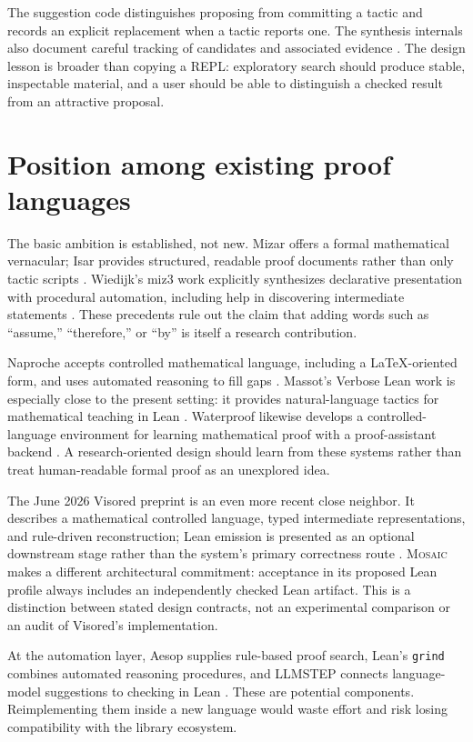 \documentclass[11pt,a4paper]{article}
\newcommand{\code}[1]{\texttt{\small #1}}
\newcommand{\Mosaic}{\textsc{Mosaic}}
\theoremstyle{definition}
\theoremstyle{remark}
\begin{document}
The suggestion code distinguishes proposing from committing a tactic and records an explicit replacement when a tactic reports one. The synthesis internals also document careful tracking of candidates and associated evidence \cite{leant-main,leant-internals}. The design lesson is broader than copying a REPL: exploratory search should produce stable, inspectable material, and a user should be able to distinguish a checked result from an attractive proposal.

\section{Position among existing proof languages}
\label{sec:prior}
The basic ambition is established, not new. Mizar offers a formal mathematical vernacular; Isar provides structured, readable proof documents rather than only tactic scripts \cite{mizar,isar}. Wiedijk's miz3 work explicitly synthesizes declarative presentation with procedural automation, including help in discovering intermediate statements \cite{miz3}. These precedents rule out the claim that adding words such as ``assume,'' ``therefore,'' or ``by'' is itself a research contribution.

Naproche accepts controlled mathematical language, including a LaTeX-oriented form, and uses automated reasoning to fill gaps \cite{naproche,naproche-paper}. Massot's Verbose Lean work is especially close to the present setting: it provides natural-language tactics for mathematical teaching in Lean \cite{verbose-paper,verbose-repo}. Waterproof likewise develops a controlled-language environment for learning mathematical proof with a proof-assistant backend \cite{waterproof}. A research-oriented design should learn from these systems rather than treat human-readable formal proof as an unexplored idea.

The June 2026 Visored preprint is an even more recent close neighbor. It describes a mathematical controlled language, typed intermediate representations, and rule-driven reconstruction; Lean emission is presented as an optional downstream stage rather than the system's primary correctness route \cite{visored}. \Mosaic{} makes a different architectural commitment: acceptance in its proposed Lean profile always includes an independently checked Lean artifact. This is a distinction between stated design contracts, not an experimental comparison or an audit of Visored's implementation.

At the automation layer, Aesop supplies rule-based proof search, Lean's \code{grind} combines automated reasoning procedures, and LLMSTEP connects language-model suggestions to checking in Lean \cite{aesop,grind,llmstep}. These are potential components. Reimplementing them inside a new language would waste effort and risk losing compatibility with the library ecosystem.
\end{document}
